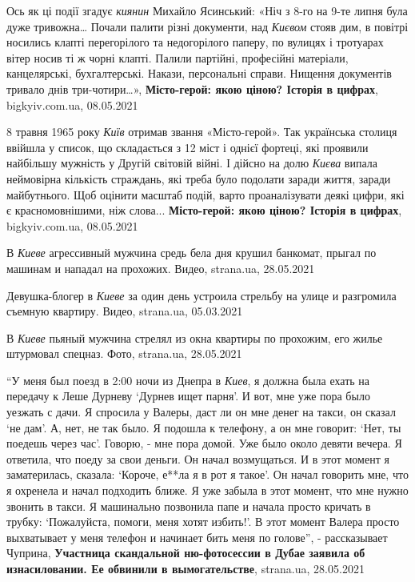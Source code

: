 Ось як ці події згадує \emph{киянин} Михайло Ясинський: «Ніч з 8-го на 9-те
липня була дуже тривожна… Почали палити різні документи, над \emph{Києвом}
стояв дим, в повітрі носились клапті перегорілого та недогорілого паперу, по
вулицях і тротуарах вітер носив ті ж чорні клапті. Палили партійні, професійні
матеріали, канцелярські, бухгалтерські. Накази, персональні справи.  Нищення
документів тривало днів три-чотири…», \textbf{Місто-герой: якою ціною? Історія
в цифрах}, bigkyiv.com.ua, 08.05.2021

8 травня 1965 року \emph{Київ} отримав звання «Місто-герой». Так українська
столиця ввійшла у список, що складається з 12 міст і однієї фортеці, які
проявили найбільшу мужність у Другій світовій війні. І дійсно на долю
\emph{Києва} випала неймовірна кількість страждань, які треба було подолати
заради життя, заради майбутнього. Щоб оцінити масштаб подій, варто
проаналізувати деякі цифри, які є красномовнішими, ніж слова...
\textbf{Місто-герой: якою ціною? Історія в цифрах}, bigkyiv.com.ua, 08.05.2021

В \emph{Киеве} агрессивный мужчина средь бела дня крушил банкомат, прыгал по
машинам и нападал на прохожих. Видео, strana.ua, 28.05.2021

Девушка-блогер в \emph{Киеве} за один день устроила стрельбу на улице и
разгромила съемную квартиру. Видео, strana.ua, 05.03.2021

В \emph{Киеве} пьяный мужчина стрелял из окна квартиры по прохожим, его жилье
штурмовал спецназ. Фото, strana.ua, 28.05.2021

\enquote{У меня был поезд в 2:00 ночи из Днепра в \emph{Киев}, я должна была ехать на передачу
к Леше Дурневу \enquote{Дурнев ищет парня}. И вот, мне уже пора было уезжать с дачи. Я
спросила у Валеры, даст ли он мне денег на такси, он сказал \enquote{не дам}. А, нет,
не так было. Я подошла к телефону, а он мне говорит: \enquote{Нет, ты поедешь через
час}. Говорю, - мне пора домой. Уже было около девяти вечера. Я ответила, что
поеду за свои деньги. Он начал возмущаться. И в этот момент я заматерилась,
сказала: \enquote{Короче, е**ла я в рот я такое}. Он начал говорить мне, что я
охренела и начал подходить ближе. Я уже забыла в этот момент, что мне нужно
звонить в такси. Я машинально позвонила папе и начала просто кричать в трубку:
\enquote{Пожалуйста, помоги, меня хотят избить!}. В этот момент Валера просто
выхватывает у меня телефон и начинает бить меня по голове}, - рассказывает
Чуприна, \textbf{Участница скандальной ню-фотосессии в Дубае заявила об
изнасиловании. Ее обвинили в вымогательстве}, strana.ua, 28.05.2021

